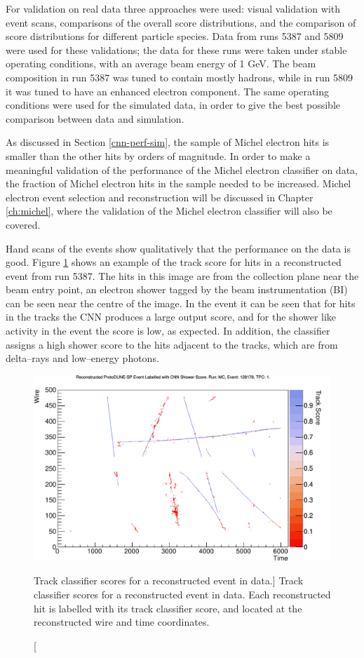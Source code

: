 For validation on real \protodune{} data three approaches were used: visual
validation with event scans, comparisons of the overall score distributions, 
and the comparison of score distributions for different particle species. Data 
from \protodune{} runs 5387 and 5809 were used for these validations; the data 
for these runs were taken under stable operating conditions, with an average 
beam energy of 1 GeV. The beam composition in run 5387 was tuned to contain
mostly hadrons, while in run 5809 it was tuned to have an enhanced electron
component. The same operating conditions were used for the simulated data, in
order to give the best possible comparison between data and simulation.

As discussed in Section \ref{cnn-perf-sim}, the sample of Michel electron hits
is smaller than the other hits by orders of magnitude. In order to make a
meaningful validation of the performance of the Michel electron classifier on
data, the fraction of Michel electron hits in the sample needed to be increased.
Michel electron event selection and reconstruction will be discussed in Chapter
\ref{ch:michel}, where the validation of the Michel electron classifier will
also be covered.

Hand scans of the events show qualitatively that the performance on the data is
good. Figure \ref{fig:real_event} shows an example of the track score for hits
in a reconstructed event from run 5387. The hits in this image are from the
collection plane near the beam entry point, an electron shower tagged by the
beam instrumentation (BI) can be seen near the centre of the image. In the event
it can be seen that for hits in the tracks the CNN produces a large output 
score, and for the shower like activity in the event the score is low, as
expected. In addition, the classifier assigns a high shower score to the hits 
adjacent to the tracks, which are from delta--rays and low--energy photons.

\begin{figure}
	\centering
	\includegraphics[width=\textwidth]{figures/5387_image_tpc1_view2_128178.pdf}
	\caption
	[Track classifier scores for a reconstructed event in \protodune{} data.]
	{Track classifier scores for a reconstructed event in \protodune{} data. Each
	reconstructed hit is labelled with its track classifier score, and located at
	the reconstructed wire and time coordinates.}
	\label{fig:real_event}
\end{figure}

